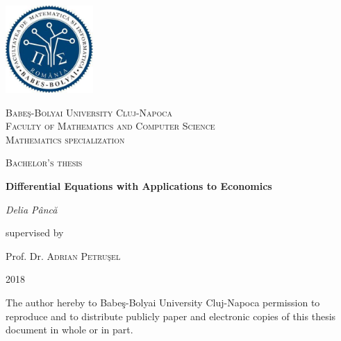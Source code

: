 \documentclass[a4paper,12pt]{report}
\newcommand\blankpage{%
    \null
    \thispagestyle{empty}%
    \addtocounter{page}{-1}%
    \newpage}
\begin{document}
 \begin{titlepage}
 
	\centering
	\includegraphics[width=0.25\textwidth]{Facultate1.jpg}\par\vspace{1cm}
	{\scshape\LARGE Babe\c{s}-Bolyai University Cluj-Napoca\\ Faculty of Mathematics and Computer Science \\ Mathematics specialization \par}
	\vspace{1cm}
	{\scshape\Large Bachelor's thesis\par}
	\vspace{1.5cm}
	{\huge\bfseries Differential Equations with Applications to Economics\par}
	\vspace{2cm}
	{\Large\itshape Delia P\^{a}nc\u{a}\par}
	\vfill
	supervised by\par
	Prof. Dr.  \textsc{Adrian Petru\c{s}el}

	\vfill

	{2018}
\end{titlepage}
\begin{flushleft}


\vspace{20mm}
\par
\vspace{10mm}
\par
\vspace{15mm}
The author hereby to Babe\c{s}-Bolyai University Cluj-Napoca permission to reproduce and  to distribute publicly paper and electronic copies of this thesis document in whole or in part.



\end{flushleft}
 \tableofcontents
\end{document}
